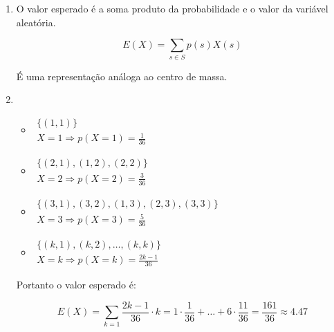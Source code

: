 \item
	\begin{enumerate}
		\item 
		O valor esperado é a soma produto da probabilidade e o valor da variável aleatória.

		\[E(X) = \sum\limits_{s \in S} {p(s)X(s)} \]

		É uma representação análoga ao centro de massa.

		\item
		\begin{itemize}
			\item 
				$\begin{array}{l}
				\{ (1,1)\} \\
				X = 1 \Rightarrow p(X = 1) = \frac{1}{{36}}
				\end{array}$
			\item
				$\begin{array}{l}
				\{ (2,1),(1,2),(2,2)\} \\
				X = 2 \Rightarrow p(X = 2) = \frac{3}{{36}}
				\end{array}$
			\item
				$\begin{array}{l}
				\{ (3,1),(3,2),(1,3),(2,3),(3,3)\} \\
				X = 3 \Rightarrow p(X = 3) = \frac{5}{{36}}
				\end{array}$
			\item
				$\begin{array}{l}
				\{ (k,1),(k,2), \ldots ,(k,k)\} \\
				X = k \Rightarrow p(X = k) = \frac{{2k - 1}}{{36}}
				\end{array}$
		\end{itemize}

		Portanto o valor esperado é:

		\[E(X) = \sum\limits_{k = 1} {\frac{{2k - 1}}{{36}} \cdot k}  = 1 \cdot \frac{1}{{36}} +  \ldots  + 6 \cdot \frac{{11}}{{36}} = \frac{{161}}{{36}} \approx 4.47\]

	\end{enumerate}